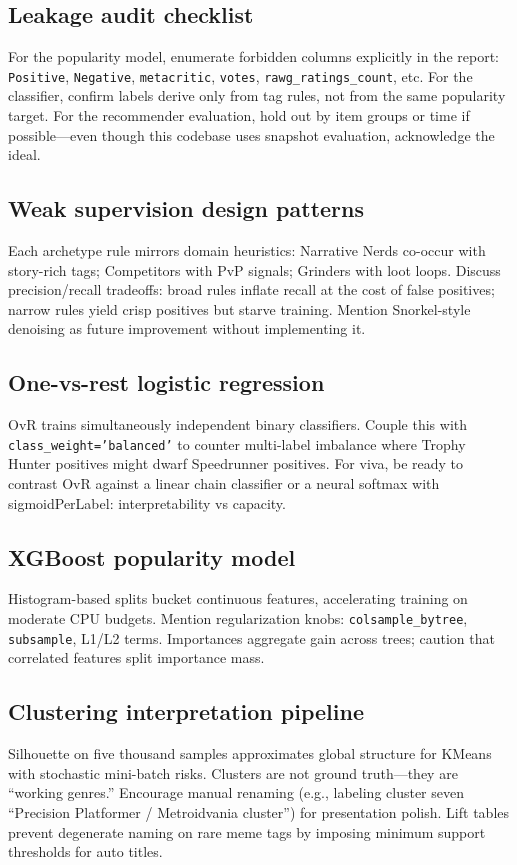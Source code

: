 \subsection{Leakage audit checklist}
For the popularity model, enumerate forbidden columns explicitly in the report: \texttt{Positive}, \texttt{Negative}, \texttt{metacritic}, \texttt{votes}, \texttt{rawg\_ratings\_count}, etc. For the classifier, confirm labels derive only from tag rules, not from the same popularity target. For the recommender evaluation, hold out by item groups or time if possible---even though this codebase uses snapshot evaluation, acknowledge the ideal.

\subsection{Weak supervision design patterns}
Each archetype rule mirrors domain heuristics: Narrative Nerds co-occur with story-rich tags; Competitors with PvP signals; Grinders with loot loops. Discuss precision/recall tradeoffs: broad rules inflate recall at the cost of false positives; narrow rules yield crisp positives but starve training. Mention Snorkel-style denoising as future improvement without implementing it.

\subsection{One-vs-rest logistic regression}
OvR trains simultaneously independent binary classifiers. Couple this with \texttt{class\_weight='balanced'} to counter multi-label imbalance where Trophy Hunter positives might dwarf Speedrunner positives. For viva, be ready to contrast OvR against a linear chain classifier or a neural softmax with sigmoidPerLabel: interpretability vs capacity.

\subsection{XGBoost popularity model}
Histogram-based splits bucket continuous features, accelerating training on moderate CPU budgets. Mention regularization knobs: \texttt{colsample\_bytree}, \texttt{subsample}, L1/L2 terms. Importances aggregate gain across trees; caution that correlated features split importance mass.

\subsection{Clustering interpretation pipeline}
Silhouette on five thousand samples approximates global structure for KMeans with stochastic mini-batch risks. Clusters are not ground truth---they are ``working genres.'' Encourage manual renaming (e.g., labeling cluster seven ``Precision Platformer / Metroidvania cluster'') for presentation polish. Lift tables prevent degenerate naming on rare meme tags by imposing minimum support thresholds for auto titles.

